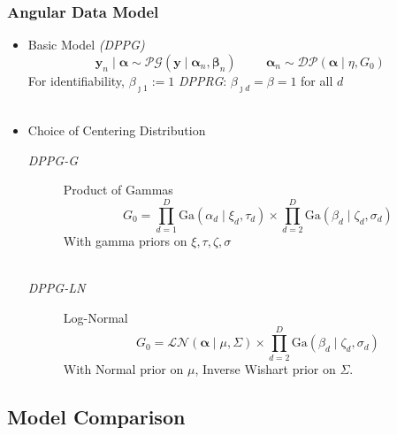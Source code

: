 \documentclass[aspectratio=169,10pt]{beamer}
\begin{document}
\begin{frame}
    \frametitle{Angular Data Model}
    \label{pgpareto:angulardatamodel}
    {\small
    \begin{itemize}
    \item Basic Model \emph{(DPPG)}
        \[
            \bm{y}_n\mid\bm{\alpha} \sim 
            \mathcal{PG}\left(\bm{y}\mid\bm{\alpha}_n,\bm{\beta}_n\right)
            \hspace{1cm}
            \bm{\alpha}_n \sim 
            \mathcal{DP}(\bm{\alpha}\mid\eta, G_0)
        \]
        For identifiability, $\beta_{\jmath 1} := 1$\hspace{1cm}
            \emph{DPPRG}: $\beta_{\jmath d} = \beta = 1$ for all $d$\\~
    \item Choice of Centering Distribution
        \begin{description}
            \item[\emph{DPPG-G}] Product of Gammas
                \[
                G_0 = \prod_{d = 1}^D\text{Ga}\left(\alpha_d\mid \xi_d,\tau_d\right)
                \times\prod_{d=2}^D\text{Ga}\left(\beta_d\mid \zeta_d,\sigma_d\right)
                \]
                With gamma priors on $\xi,\tau,\zeta,\sigma$\\~
            \item[\emph{DPPG-LN}] Log-Normal
                \[
                G_0 = \mathcal{LN}\left(\bm{\alpha}\mid\mu,\Sigma\right) \times \prod_{d = 2}^D\text{Ga}\left(\beta_d\mid \zeta_d,\sigma_d\right)
                \]
                With Normal prior on $\mu$, Inverse Wishart prior on $\Sigma$.
        \end{description}
    \end{itemize}
    }
    \hyperlink{pgpareto:pginference}{}
\end{frame} %

\subsection{Model Comparison}
\end{document}
